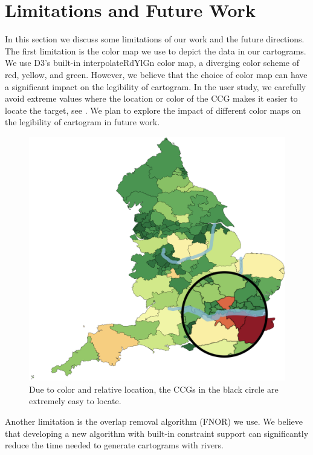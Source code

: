 \section{Limitations and Future Work}

In this section we discuss some limitations of our work and the future directions. The first limitation is the color map we use to depict the data in our cartograms. We use D3's built-in interpolateRdYlGn color map, a diverging color scheme of red, yellow, and green. However, we believe that the choice of color map can have a significant impact on the legibility of cartogram. In the user study, we carefully avoid extreme values where the location or color of the CCG makes it easier to locate the target, see . We plan to explore the impact of different color maps on the legibility of cartogram in future work.

{
    \begin{figure}[htb!]
        \centering
        \includegraphics[width=\columnwidth,keepaspectratio]{figure/limitations/extreme.png}
        \caption{Due to color and relative location, the CCGs in the black circle are extremely easy to locate.}
        \label{fig:extreme}
    \end{figure}
}

Another limitation is the overlap removal algorithm (FNOR) we use. We believe that developing a new algorithm with built-in constraint support can significantly reduce the time needed to generate cartograms with rivers.
